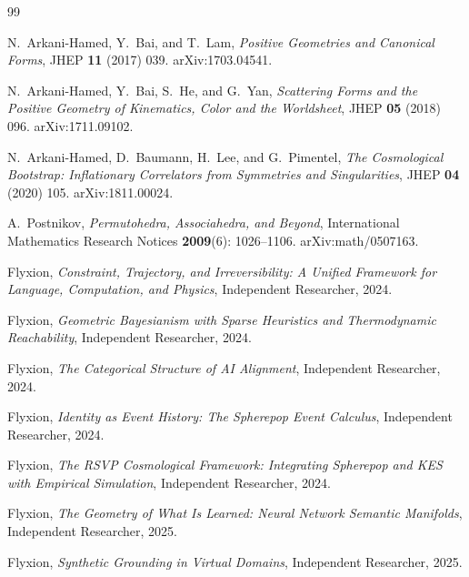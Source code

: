 \documentclass[12pt, oneside]{amsart}
\theoremstyle{plain}
\theoremstyle{definition}
\theoremstyle{remark}
\begin{document}
\begin{thebibliography}{99}

N.~Arkani-Hamed, Y.~Bai, and T.~Lam, \textit{Positive Geometries and Canonical Forms}, JHEP \textbf{11} (2017) 039. arXiv:1703.04541.

N.~Arkani-Hamed, Y.~Bai, S.~He, and G.~Yan, \textit{Scattering Forms and the Positive Geometry of Kinematics, Color and the Worldsheet}, JHEP \textbf{05} (2018) 096. arXiv:1711.09102.

N.~Arkani-Hamed, D.~Baumann, H.~Lee, and G.~Pimentel, \textit{The Cosmological Bootstrap: Inflationary Correlators from Symmetries and Singularities}, JHEP \textbf{04} (2020) 105. arXiv:1811.00024.

A.~Postnikov, \textit{Permutohedra, Associahedra, and Beyond}, International Mathematics Research Notices \textbf{2009}(6): 1026--1106. arXiv:math/0507163.

Flyxion, \textit{Constraint, Trajectory, and Irreversibility: A Unified Framework for Language, Computation, and Physics}, Independent Researcher, 2024.

Flyxion, \textit{Geometric Bayesianism with Sparse Heuristics and Thermodynamic Reachability}, Independent Researcher, 2024.

Flyxion, \textit{The Categorical Structure of AI Alignment}, Independent Researcher, 2024.

Flyxion, \textit{Identity as Event History: The Spherepop Event Calculus}, Independent Researcher, 2024.

Flyxion, \textit{The RSVP Cosmological Framework: Integrating Spherepop and KES with Empirical Simulation}, Independent Researcher, 2024.

Flyxion, \textit{The Geometry of What Is Learned: Neural Network Semantic Manifolds}, Independent Researcher, 2025.

Flyxion, \textit{Synthetic Grounding in Virtual Domains}, Independent Researcher, 2025.

\end{thebibliography}
\end{document}
